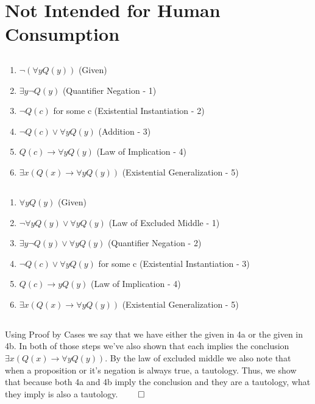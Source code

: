 \documentclass[11pt]{article}
\makeatletter
\def\imp{\rightarrow}
\renewenvironment{proof}[1][\proofname]{\par
  \normalfont \topsep6\p@\@plus6\p@\relax
  \trivlist
  \item[\hskip\labelsep
        \itshape
    #1\@addpunct{.}]\ignorespaces
}{%
  \endtrivlist\@endpefalse
}
\makeatother
\begin{document}
\section{Not Intended for Human Consumption} %
\subsection{} %
\begin{proof}[\textbf{Prove $\exists x (Q(x) \imp \forall y Q(y))$}] \leavevmode
 	\begin{enumerate}
		\item $\neg (\forall y Q(y))$ \hfill (Given)
		\item $\exists y \neg Q(y)$ \hfill (Quantifier Negation - 1)
		\item $\neg Q(c)$ for some c \hfill (Existential Instantiation - 2)
		\item $\neg Q(c) \lor \forall y Q(y)$ \hfill (Addition - 3)
		\item $Q(c) \imp \forall y Q(y)$ \hfill (Law of Implication - 4)
		\item $\exists x (Q(x) \imp \forall y Q(y))$ \hfill (Existential Generalization - 5)
	\end{enumerate}
\end{proof}

\subsection{} %
\begin{proof}[\textbf{Prove $\exists x (Q(x) \imp \forall y Q(y))$}] \leavevmode
 	\begin{enumerate}
		\item $\forall y Q(y)$ \hfill (Given)
		\item $\neg \forall y Q(y) \lor \forall y Q(y)$ \hfill (Law of Excluded Middle - 1)
		\item $\exists y \neg Q(y) \lor \forall y Q(y)$ \hfill (Quantifier Negation - 2)
		\item $\neg Q(c) \lor \forall y Q(y)$ for some c \hfill (Existential Instantiation - 3)
		\item $Q(c) \imp y Q(y)$ \hfill (Law of Implication - 4)
		\item $\exists x (Q(x) \imp \forall y Q(y))$ \hfill (Existential Generalization - 5)
	\end{enumerate}
\end{proof}

\subsection{} %
Using Proof by Cases we say that we have either the given in 4a or the given in 4b. In both of those steps we've also shown that each implies the conclusion $\exists x (Q(x) \imp \forall y Q(y))$. By the law of excluded middle we also note that when a proposition or it's negation is always true, a tautology. Thus, we show that because both 4a and 4b imply the conclusion and they are a tautology, what they imply is also a tautology. $\qed$ 
\end{document}
